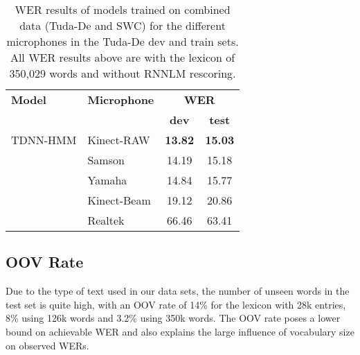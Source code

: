 \documentclass[a4paper]{article}
\begin{document}
\begin{table}[t]
  \centering
  \begin{tabular}{llcc}
    \toprule
    \textbf{Model} &   \textbf{Microphone} & \multicolumn{2}{c}{\textbf{WER}} \\ 
                   &                       & \textbf{dev} & \textbf{test} \\  
    \midrule
TDNN-HMM
                   & Kinect-RAW & \textbf{13.82} & \textbf{15.03} \\
                   & Samson & 14.19 & 15.18 \\
                   & Yamaha & 14.84 & 15.77 \\
                   & Kinect-Beam & 19.12 & 20.86 \\
                   & Realtek & 66.46 & 63.41 \\
\bottomrule
  \end{tabular}
  \caption{WER results of models trained on combined data (Tuda-De and SWC) for the different microphones in the Tuda-De dev and train sets. All WER results above are with the lexicon of 350,029 words and without RNNLM rescoring.}
  \label{tab:microphones}
  \vspace{-3mm}

\end{table}































\subsection{OOV Rate}
\label{sec:oov-rate}

Due to the type of text used in our data sets, the number of
unseen words in the test set is quite high, with an OOV rate of 14\% for the lexicon with 28k entries, 8\% using 126k words and 3.2\% using 350k words. The OOV rate poses a lower bound on achievable WER and also explains the large influence of vocabulary size on observed WERs.
\end{document}
